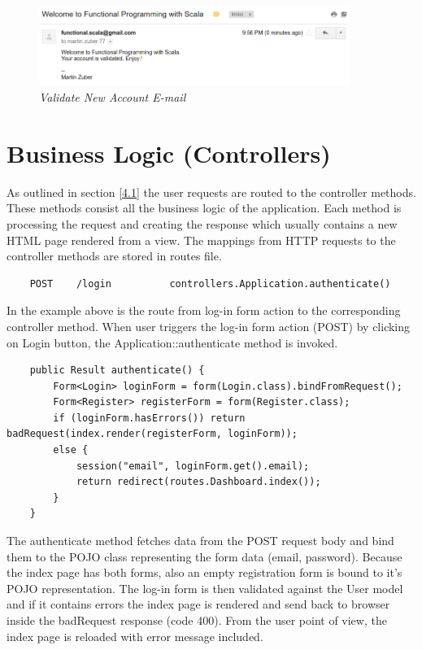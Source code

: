 \documentclass[12pt,twoside,a4paper]{report}
\begin{document}
\begin{figure}[!ht]
	\centering
		\includegraphics[width=0.9\textwidth, totalheight=4cm]
		{register_notification_email}
	\caption{\textit{Validate New Account E-mail}}
	\label{f4.4.1.2}
\end{figure}


\section{Business Logic (Controllers)}\label{4.5}
As outlined in section \ref{4.1} the user requests are routed to the controller methods. These methods consist all the business logic of the application. Each method is processing the request and creating the response which usually contains a new HTML page rendered from a view. The mappings from HTTP requests to the controller methods are stored in routes file.

\begin{lstlisting}
	POST    /login     		controllers.Application.authenticate()
\end{lstlisting}

In the example above is the route from log-in form action to the corresponding controller method. When user triggers the log-in form action (POST) by clicking on Login button, the Application::authenticate method is invoked.

\begin{lstlisting}
	public Result authenticate() {
        Form<Login> loginForm = form(Login.class).bindFromRequest();
        Form<Register> registerForm = form(Register.class);
        if (loginForm.hasErrors()) return badRequest(index.render(registerForm, loginForm));
        else {
            session("email", loginForm.get().email);
            return redirect(routes.Dashboard.index());
        }
    }
\end{lstlisting}

The authenticate method fetches data from the POST request body and bind them to the POJO class representing the form data (email, password). Because the index page has both forms, also an empty registration form is bound to it's POJO representation. The log-in form is then validated against the User model and if it contains errors the index page is rendered and send back to browser inside the badRequest response (code 400). From the user point of view, the index page is reloaded with error message included.
\end{document}
